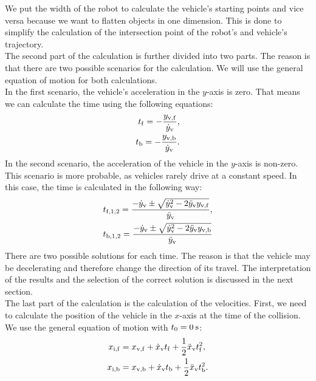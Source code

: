         We put the width of the robot to calculate the vehicle's starting points and vice versa because we want to flatten objects in one dimension. This is done to simplify the calculation of the intersection point of the robot's and vehicle's trajectory.\\
        The second part of the calculation is further divided into two parts. The reason is that there are two possible scenarios for the calculation. We will use the general equation of motion \cite{equation_motion} for both calculations.\\
        In the first scenario, the vehicle's acceleration in the $y$-axis is zero. That means we can calculate the time using the following equations:
        \begin{align}
            t_{\rm{f}} = -\frac{y_{\rm{v,f}}}{\dot{y}_{\rm{v}}},\\
            t_{\rm{b}} = -\frac{y_{\rm{v,b}}}{\dot{y}_{\rm{v}}}.
        \end{align}
        In the second scenario, the acceleration of the vehicle in the $y$-axis is non-zero. This scenario is more probable, as vehicles rarely drive at a constant speed. In this case, the time is calculated in the following way:
        \begin{align}
            t_{\rm{f},1,2} = \frac{-\dot{y}_{\rm{v}}\pm\sqrt{\dot{y}_{\rm{v}}^2-2\ddot{y}_{\rm{v}}y_{\rm{v,f}}}}{\ddot{y}_{\rm{v}}},\\
            t_{\rm{b},1,2} = \frac{-\dot{y}_{\rm{v}}\pm\sqrt{\dot{y}_{\rm{v}}^2-2\ddot{y}_{\rm{v}}y_{\rm{v,b}}}}{\ddot{y}_{\rm{v}}}
        \end{align}
        There are two possible solutions for each time. The reason is that the vehicle may be decelerating and therefore change the direction of its travel. The interpretation of the results and the selection of the correct solution is discussed in the next section.\\
        The last part of the calculation is the calculation of the velocities. First, we need to calculate the position of the vehicle in the $x$-axis at the time of the collision. We use the general equation of motion with $t_{0}=0\:\rm{s}$:
        \begin{align}
            x_{\rm{i,f}} &= x_{\rm{v,f}} + \dot{x}_{\rm{v}}t_{\rm{f}} + \frac{1}{2}\ddot{x}_{\rm{v}}t_{\rm{f}}^2,\\
            x_{\rm{i,b}} &= x_{\rm{v,b}} + \dot{x}_{\rm{v}}t_{\rm{b}} + \frac{1}{2}\ddot{x}_{\rm{v}}t_{\rm{b}}^2.
        \end{align}
